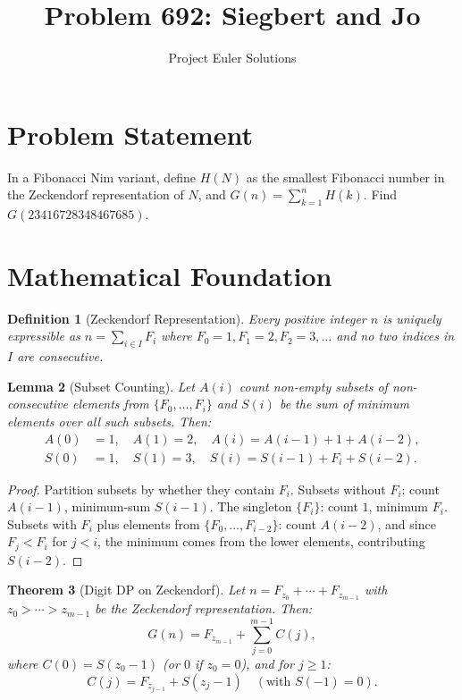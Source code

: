 \documentclass[11pt]{article}
\title{Problem 692: Siegbert and Jo}
\author{Project Euler Solutions}
\date{}
\newtheorem{theorem}{Theorem}
\newtheorem{lemma}[theorem]{Lemma}
\newtheorem{definition}[theorem]{Definition}
\begin{document}
\maketitle

\section{Problem Statement}

In a Fibonacci Nim variant, define $H(N)$ as the smallest Fibonacci number in the Zeckendorf representation of $N$, and $G(n) = \sum_{k=1}^{n} H(k)$. Find $G(23416728348467685)$.

\section{Mathematical Foundation}

\begin{definition}[Zeckendorf Representation]
Every positive integer $n$ is uniquely expressible as $n = \sum_{i \in I} F_i$ where $F_0 = 1, F_1 = 2, F_2 = 3, \ldots$ and no two indices in $I$ are consecutive.
\end{definition}

\begin{lemma}[Subset Counting]
Let $A(i)$ count non-empty subsets of non-consecutive elements from $\{F_0, \ldots, F_i\}$ and $S(i)$ be the sum of minimum elements over all such subsets. Then:
\begin{align}
A(0) &= 1, \quad A(1) = 2, \quad A(i) = A(i-1) + 1 + A(i-2), \\
S(0) &= 1, \quad S(1) = 3, \quad S(i) = S(i-1) + F_i + S(i-2).
\end{align}
\end{lemma}

\begin{proof}
Partition subsets by whether they contain $F_i$. Subsets without $F_i$: count $A(i-1)$, minimum-sum $S(i-1)$. The singleton $\{F_i\}$: count $1$, minimum $F_i$. Subsets with $F_i$ plus elements from $\{F_0, \ldots, F_{i-2}\}$: count $A(i-2)$, and since $F_j < F_i$ for $j < i$, the minimum comes from the lower elements, contributing $S(i-2)$.
\end{proof}

\begin{theorem}[Digit DP on Zeckendorf]
Let $n = F_{z_0} + \cdots + F_{z_{m-1}}$ with $z_0 > \cdots > z_{m-1}$ be the Zeckendorf representation. Then:
\[
G(n) = F_{z_{m-1}} + \sum_{j=0}^{m-1} C(j),
\]
where $C(0) = S(z_0 - 1)$ (or $0$ if $z_0 = 0$), and for $j \geq 1$:
\[
C(j) = F_{z_{j-1}} + S(z_j - 1) \quad (\text{with } S(-1) = 0).
\]
\end{theorem}
\end{document}
